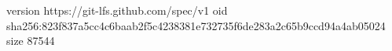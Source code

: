 version https://git-lfs.github.com/spec/v1
oid sha256:823f837a5cc4c6baab2f5c4238381e732735f6de283a2c65b9ccd94a4ab05024
size 87544
